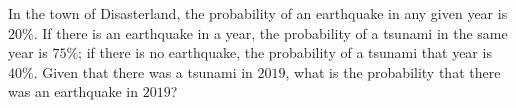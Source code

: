 In the town of Disasterland, the probability of an earthquake in any given year is $20\%$. If there is an earthquake in a year, the probability of a tsunami in the same year is $75\%$; if there is no earthquake, the probability of a tsunami that year is $40\%$. Given that there was a tsunami in $2019$, what is the probability that there was an earthquake in $2019$?
